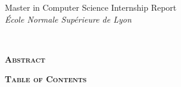 {\noindent
\large
Master in Computer Science \hfill Internship Report\\
\textit{École Normale Supérieure de Lyon} \hfill \textsc{\theauthor}}

\vspace{2.8em}

\hfuzz=5.002pt
\noindent
\setlength{\fboxsep}{15pt}
\colorbox{gray!20}{\parbox{\linewidth-30pt}{\raggedleft
    \vspace{2.5em}
    {\Large \textbf{\thetitle}} \\
    {\large \textit{\thesubtitle}}
}}

\vspace{2.5em}

\begin{center}
\textsc{\thecredits}
\end{center}

\vspace{1.3em}

\begin{center}
\parbox{0.84\linewidth}{
\setlength{\parindent}{11.1pt}
\noindent
\textsc{\textbf{Abstract}}\\

\theabstract
}
\end{center}

\vspace{1.3em}

\begin{center}
\parbox{0.84\linewidth}{
\setlength{\parindent}{11.1pt}
\noindent
\textsc{\textbf{Table of Contents}}

\vspace{-4em}
\renewcommand\contentsname{}
\tableofcontents}
\end{center}

\newpage
{}
\restoregeometry
